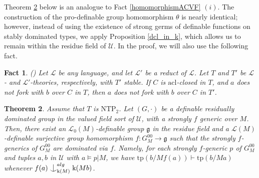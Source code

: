 \documentclass[12pt]{article}
\newcommand{\tpp}{\mathrm{tp}}
\newcommand{\NTP}{\mathrm{NTP_2}}
\newcommand{\acl}{\mathrm{acl}}
\newcommand{\alg}{\mathrm{alg}}
\newcommand{\st}{\mathrm{St}}
\newcommand{\0}{\emptyset}
\newcommand{\rf}{\mathrm{k}}
\newcommand{\U}{\mathcal{U}}
\def\forkindep{\mathrel{\raise0.2ex\hbox{\ooalign{\hidewidth$\vert$\hidewidth\cr\raise-0.9ex\hbox{$\smile$}}}}}
\theoremstyle{plain}%
\newtheorem{thm}{Theorem}[section]
\newtheorem{fact}[thm]{Fact}
\theoremstyle{definition}
\theoremstyle{remark}
\begin{document}

Theorem \ref{HomomorphismResidue} below is an analogue to Fact \ref{homomorphismACVF} $(i)$. The construction of the pro-definable group homomorphism $\theta$ is nearly identical; however, instead of using the existence of strong germs of definable functions on stably dominated types, we apply Proposition \ref{dcl_in_k}, which allows us to remain within the residue field of $\U$. In the proof, we will also use the following fact.

\begin{fact}\label{nonforking_reduct}(\cite[Lemme 2.1]{BMW11}) Let $\mathcal{L}$ be any language, and let $\mathcal{L}'$ be a reduct of $\mathcal{L}$. Let $T$ and $T'$ be $\mathcal{L}$- and $\mathcal{L}'$-theories, respectively, with $T'$ stable. If $C$ is $\acl$-closed in $T$, and $a$ does not fork with $b$ over $C$ in $T$, then $a$ does not fork with $b$ over $C$ in $T'$.\end{fact}




\begin{thm}\label{HomomorphismResidue}
 Assume that $T$ is $\NTP$. Let $(G,\cdot)$ be a definable residually dominated group in the valued field sort of $\U$, with a strongly $f$ generic over $M$. Then, there exist an $\mathcal{L}_0(M)$-definable group $\mathfrak{g}$ in the residue field and a $\mathcal{L}(M)$-definable surjective group homomorphism $f: G_M^{00}\to \mathfrak{g}$ such that the strongly $f$-generics of $G_M^{00}$ are dominated via $f$. Namely, for each strongly $f$-generic $p$ of $G_M^{00}$ and tuples $a, b$ in $\U$ with $a \models p|M$, we have $\tpp(b/M f(a))\vdash \tpp(b/Ma)$ whenever $f(a)\forkindep_{\rf(M)}^{alg}\rf(Mb)$.
\end{thm}
\end{document}
